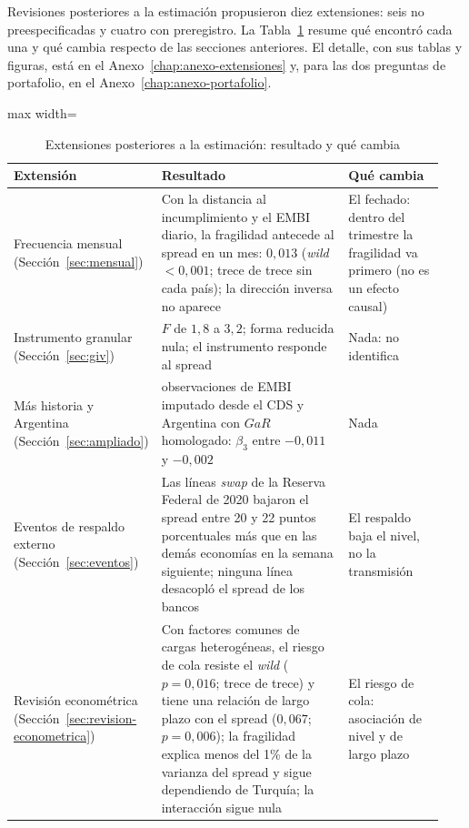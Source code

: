 Revisiones posteriores a la estimación propusieron diez extensiones: seis no preespecificadas y cuatro con preregistro. La Tabla~\ref{tab:extensiones-resumen} resume qué encontró cada una y qué cambia respecto de las secciones anteriores. El detalle, con sus tablas y figuras, está en el Anexo~\ref{chap:anexo-extensiones} y, para las dos preguntas de portafolio, en el Anexo~\ref{chap:anexo-portafolio}.

\begin{table}[htbp]
\centering
\footnotesize
\caption[Extensiones posteriores a la estimación]{Extensiones posteriores a la estimación: resultado y qué cambia}
\label{tab:extensiones-resumen}
\begin{adjustbox}{max width=\linewidth}
\begin{tabular}{>{\raggedright\arraybackslash}p{0.24\linewidth}>{\raggedright\arraybackslash}p{0.47\linewidth}>{\raggedright\arraybackslash}p{0.23\linewidth}}
\toprule
Extensión & Resultado & Qué cambia \\
\midrule
Frecuencia mensual (Sección~\ref{sec:mensual}) & Con la distancia al incumplimiento y el EMBI diario, la fragilidad antecede al spread en un mes: $0{,}013$ (\textit{wild} $<0{,}001$; trece de trece sin cada país); la dirección inversa no aparece & El fechado: dentro del trimestre la fragilidad va primero (no es un efecto causal) \\
\addlinespace
Instrumento granular (Sección~\ref{sec:giv}) & $F$ de $1{,}8$ a $3{,}2$; forma reducida nula; el instrumento responde al spread & Nada: no identifica \\
\addlinespace
Más historia y Argentina (Sección~\ref{sec:ampliado}) & 189 observaciones de EMBI imputado desde el CDS y Argentina con $GaR$ homologado: $\beta_3$ entre $-0{,}011$ y $-0{,}002$ & Nada \\
\addlinespace
Eventos de respaldo externo (Sección~\ref{sec:eventos}) & Las líneas \textit{swap} de la Reserva Federal de 2020 bajaron el spread entre 20 y 22 puntos porcentuales más que en las demás economías en la semana siguiente; ninguna línea desacopló el spread de los bancos & El respaldo baja el nivel, no la transmisión \\
\addlinespace
Revisión econométrica (Sección~\ref{sec:revision-econometrica}) & Con factores comunes de cargas heterogéneas, el riesgo de cola resiste el \textit{wild} ($p=0{,}016$; trece de trece) y tiene una relación de largo plazo con el spread ($0{,}067$; $p=0{,}006$); la fragilidad explica menos del 1\% de la varianza del spread y sigue dependiendo de Turquía; la interacción sigue nula & El riesgo de cola: asociación de nivel y de largo plazo \\

\end{tabular}
\end{adjustbox}
\end{table}
